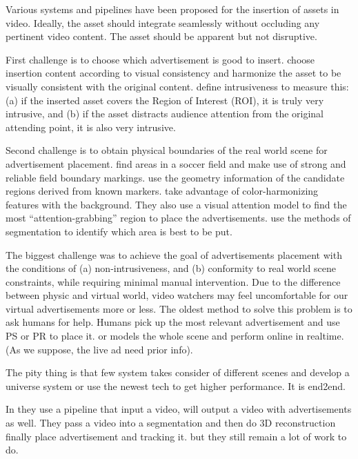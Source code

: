 \documentclass{sig-alternate}
\begin{document}
Various systems and pipelines have been proposed for the insertion of assets in video. Ideally, the asset should integrate seamlessly without occluding any pertinent video content. The asset should be apparent but not disruptive.

First challenge is to choose which advertisement is good to insert. 
\cite{26} choose insertion content according to visual consistency and \cite{6} harmonize the asset to be visually consistent with the original content. 
\cite{21} define intrusiveness to measure this: (a) if the inserted asset covers the Region of Interest (ROI), it is truly very intrusive, and (b) if the asset distracts audience attention from the original attending point, it is also very intrusive.

Second challenge is to obtain physical boundaries of the real world scene for advertisement placement. 
\cite{30} find areas in a soccer field and make use of strong and reliable field boundary markings.
\cite{29} use the geometry information of the candidate regions derived from known markers.
\cite{5} take advantage of color-harmonizing features with the background. They also use a visual attention model to find the most
“attention-grabbing” region to place the advertisements.
\cite{paper} use the methods of segmentation to identify which area is best to be put.

The biggest challenge was to achieve the goal of advertisements placement with the conditions of (a) non-intrusiveness, and (b) conformity to real world scene constraints, while requiring minimal manual intervention. 
Due to the difference between physic and virtual world, video watchers may feel uncomfortable for our virtual advertisements more or less.
The oldest method to solve this problem is to ask humans for help. Humans pick up the most relevant advertisement and use PS or PR \cite{adobe} to place it. \cite{29} or \cite{24} models the whole scene and perform online in realtime. (As we suppose, the live ad need prior info).

The pity thing is that few system takes consider of different scenes and develop a universe system or use the newest tech to get higher performance. It is end2end.

In \cite{paper} they use a pipeline that input a video, will output a video with advertisements as well. They pass a video into a segmentation and then do 3D reconstruction finally place advertisement and tracking it. but they still remain a lot of work to do.
\end{document}
